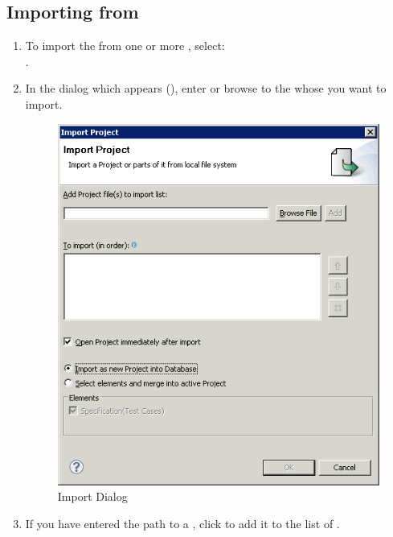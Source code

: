 \subsection{Importing \gdcases{} from \gdprojects{}}
\label{ImportTestCases}
\begin{enumerate}
\item To import the \gdcases{} from one or more \gdprojects{}, select:\\
 . 
\item In the dialog which appears (), enter or browse to the \gdprojects{} whose \gdcases{} you want to import. 


\begin{figure} [htbp]
\begin{center}
\includegraphics{Tasks/Projects/PS/Import}
\caption{Import Dialog}
\label{Import}
\end{center}
\end{figure}

\item If you have entered the path to a \gdproject{}, click  to add it to the list of \gdprojects{}.  


\end{enumerate}
